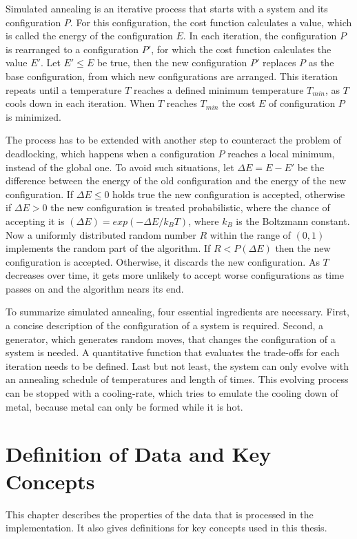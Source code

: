 \documentclass[draft,final]{vutinfth} %
\begin{document}
Simulated annealing is an iterative process that starts with a system and its configuration $P$. For this configuration, the cost function calculates a value, which is called the energy of the configuration $E$. In each iteration, the configuration $P$ is rearranged to a configuration $P'$, for which the cost function calculates the value $E'$. Let $E' \leq E$ be true, then the new configuration $P'$ replaces $P$ as the base configuration, from which new configurations are arranged. This iteration repeats until a temperature $T$ reaches a defined minimum temperature $T_{min}$, as $T$ cools down in each iteration. When $T$ reaches $T_{min}$ the cost $E$ of configuration $P$ is minimized.

The process has to be extended with another step to counteract the problem of deadlocking, which happens when a configuration $P$ reaches a local minimum, instead of the global one. To avoid such situations, let $\Delta E = E - E'$ be the difference between the energy of the old configuration and the energy of the new configuration. If $\Delta E \leq 0$ holds true  the new configuration is accepted, otherwise if $\Delta E > 0$ the new configuration is treated probabilistic, where the chance of accepting it is $(\Delta E) = exp(-\Delta E / k_B T)$, where $k_B$ is the Boltzmann constant. Now a uniformly distributed random number $R$ within the range of $(0,1)$ implements the random part of the algorithm. If $R < P(\Delta E)$ then the new configuration is accepted. Otherwise, it discards the new configuration. As $T$ decreases over time, it gets more unlikely to accept worse configurations as time passes on and the algorithm nears its end.

To summarize simulated annealing, four essential ingredients are necessary. First, a concise description of the configuration of a system is required. Second, a generator, which generates random moves, that changes the configuration of a system is needed. A quantitative function that evaluates the trade-offs for each iteration needs to be defined. Last but not least, the system can only evolve with an annealing schedule of temperatures and length of times. This evolving process can be stopped with a cooling-rate, which tries to emulate the cooling down of metal, because metal can only be formed while it is hot.


\chapter{Definition of Data and Key Concepts}
\label{chap:definitions}
This chapter describes the properties of the data that is processed in the implementation. It also gives definitions for key concepts used in this thesis.
\end{document}
